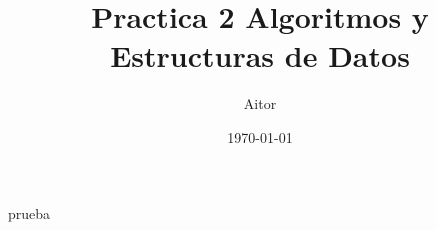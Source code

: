 \documentclass{article}
\title{Practica 2 Algoritmos y Estructuras de Datos}
\author{Aitor}
\date{\today}
\begin{document}
prueba
\end{document}
